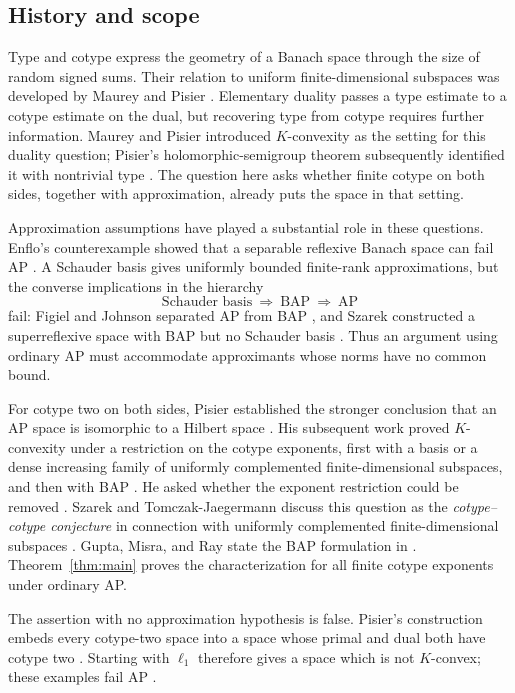 \subsection{History and scope}

Type and cotype express the geometry of a Banach space through the
size of random signed sums. Their relation to uniform finite-dimensional
subspaces was developed by Maurey and Pisier \cite{MP76}.
Elementary duality passes a type estimate to a cotype estimate on the
dual, but recovering type from cotype requires further information.
Maurey and Pisier introduced \(K\)-convexity as the setting for this
duality question; Pisier's holomorphic-semigroup theorem subsequently
identified it with nontrivial type
\cite{MP76,Pis80Kseminar,Pis82K}.
The question here asks whether finite cotype on both sides, together
with approximation, already puts the space in that setting.

Approximation assumptions have played a substantial role in these questions.
Enflo's counterexample showed that a separable reflexive Banach space can
fail AP \cite{Enf73}. A Schauder basis gives uniformly bounded finite-rank
approximations, but the converse implications in the hierarchy
\[
\text{Schauder basis}\ \Longrightarrow\ \text{BAP}\ \Longrightarrow\ \text{AP}
\]
fail: Figiel and Johnson separated AP from BAP \cite[p.~199]{FJ73}, and
Szarek constructed a superreflexive space with BAP but no Schauder basis
\cite[Theorem~1.1]{Sza87}.
Thus an argument using ordinary AP must accommodate approximants whose
norms have no common bound.

For cotype two on both sides, Pisier established the stronger conclusion
that an AP space is isomorphic to a Hilbert space
\cite[Corollaries~2.9 and~2.16]{Pis80}.
His subsequent work proved \(K\)-convexity under a restriction on the
cotype exponents, first with a basis or a dense increasing family of
uniformly complemented finite-dimensional subspaces, and then with BAP
\cite[Theorem~1, Remarks~2 and~9]{Pis81}.
He asked whether the exponent restriction could be removed
\cite[Remark~2(iii)]{Pis81}.
Szarek and Tomczak-Jaegermann discuss this question as the
\emph{cotype--cotype conjecture} in connection with uniformly complemented
finite-dimensional subspaces \cite{STJ09}.
Gupta, Misra, and Ray state the BAP formulation in
\cite[Conjecture~1.5]{GMR25}.
Theorem~\ref{thm:main} proves the characterization for all finite cotype
exponents under ordinary AP.

The assertion with no approximation hypothesis is false.
Pisier's construction embeds every cotype-two space into a space whose
primal and dual both have cotype two \cite[Theorem~3.2]{Pis83}.
Starting with \(\ell_1\) therefore gives a space which is not
\(K\)-convex; these examples fail AP \cite[Remark~3.6]{Pis83}.

